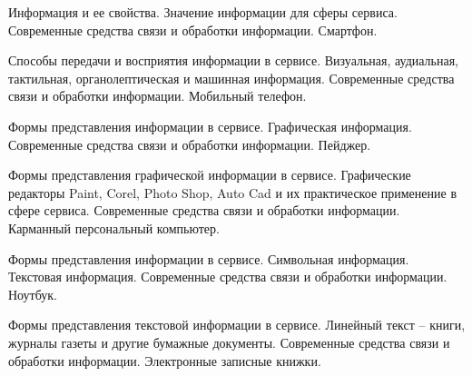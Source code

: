 \documentclass[
	14pt,
	a4paper,
	]
	{scrartcl}
\begin{document}
\shapk
{}
\setcounter{zad}{0}

\vfill
\z Информация и ее свойства. Значение информации для сферы сервиса.
 \vfill
\z Современные средства связи и обработки информации. Смартфон. \vfill

\vfill

\newpage


\shapk
{}
\setcounter{zad}{0}

\vfill
\z Способы передачи и восприятия информации в сервисе. Визуальная, аудиальная, тактильная, органолептическая и машинная информация.
 \vfill
\z Современные средства связи и обработки информации. Мобильный телефон.
 \vfill

\vfill

\newpage


\shapk
{}
\setcounter{zad}{0}

\vfill
\z Формы представления информации в сервисе. Графическая информация.
 \vfill
\z Современные средства связи и обработки информации. Пейджер.
 \vfill

\vfill

\newpage


\shapk
{}
\setcounter{zad}{0}

\vfill
\z Формы представления графической информации в сервисе. Графические редакторы Paint, Corel, Photo Shop, Auto Cad и их практическое применение в сфере сервиса.
 \vfill
\z Современные средства связи и обработки информации. Карманный персональный компьютер.
 \vfill

\vfill

\newpage


\shapk
{}
\setcounter{zad}{0}

\vfill
\z Формы представления информации в сервисе. Символьная информация. Текстовая информация.
 \vfill
\z Современные средства связи и обработки информации. Ноутбук.
 \vfill

\vfill

\newpage


\shapk
{}
\setcounter{zad}{0}

\vfill
\z Формы представления текстовой информации в сервисе. Линейный текст – книги, журналы газеты и другие бумажные документы.
 \vfill
\z Современные средства связи и обработки информации. Электронные записные книжки.
 \vfill

\vfill

\newpage
\end{document}
